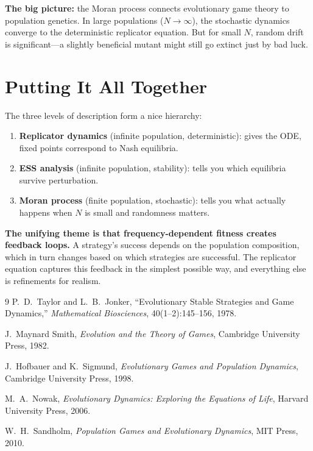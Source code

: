 \documentclass[11pt]{article}
\begin{document}
\textbf{The big picture:} the Moran process connects evolutionary game theory to population genetics. In large populations ($N \to \infty$), the stochastic dynamics converge to the deterministic replicator equation. But for small $N$, random drift is significant---a slightly beneficial mutant might still go extinct just by bad luck.

\section{Putting It All Together}

The three levels of description form a nice hierarchy:
\begin{enumerate}
    \item \textbf{Replicator dynamics} (infinite population, deterministic): gives the ODE, fixed points correspond to Nash equilibria.
    \item \textbf{ESS analysis} (infinite population, stability): tells you which equilibria survive perturbation.
    \item \textbf{Moran process} (finite population, stochastic): tells you what actually happens when $N$ is small and randomness matters.
\end{enumerate}

\textbf{The unifying theme is that frequency-dependent fitness creates feedback loops.} A strategy's success depends on the population composition, which in turn changes based on which strategies are successful. The replicator equation captures this feedback in the simplest possible way, and everything else is refinements for realism.

\begin{thebibliography}{9}
 P.\ D.\ Taylor and L.\ B.\ Jonker, ``Evolutionary Stable Strategies and Game Dynamics,'' \textit{Mathematical Biosciences}, 40(1--2):145--156, 1978.

 J.\ Maynard Smith, \textit{Evolution and the Theory of Games}, Cambridge University Press, 1982.

 J.\ Hofbauer and K.\ Sigmund, \textit{Evolutionary Games and Population Dynamics}, Cambridge University Press, 1998.

 M.\ A.\ Nowak, \textit{Evolutionary Dynamics: Exploring the Equations of Life}, Harvard University Press, 2006.

 W.\ H.\ Sandholm, \textit{Population Games and Evolutionary Dynamics}, MIT Press, 2010.
\end{thebibliography}
\end{document}
